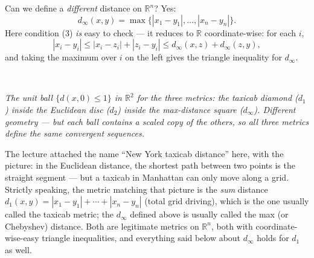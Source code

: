 \documentclass[11pt]{report}
\newcommand{\figcap}[1]{\\[1.5mm]\parbox{0.92\textwidth}{\small\itshape #1}}
\begin{document}
\begin{exbox}
Can we define a \emph{different} distance on $\mathbb{R}^n$? Yes:
\[
d_\infty(x,y) = \max\{|x_1 - y_1|, \ldots, |x_n - y_n|\}.
\]
Here condition (3) \emph{is} easy to check --- it reduces to $\mathbb{R}$ coordinate-wise: for each $i$,
\[
|x_i - y_i| \leq |x_i - z_i| + |z_i - y_i| \leq d_\infty(x,z) + d_\infty(z,y),
\]
and taking the maximum over $i$ on the left gives the triangle inequality for $d_\infty$.

\begin{center}
\figcap{The unit ball $\{ d(x, 0) \leq 1 \}$ in $\mathbb{R}^2$ for the three metrics: the taxicab diamond ($d_1$) inside the Euclidean disc ($d_2$) inside the max-distance square ($d_\infty$). Different geometry --- but each ball contains a scaled copy of the others, so all three metrics define the same convergent sequences.}
\end{center}

\end{exbox}

\begin{rembox}
The lecture attached the name ``New York taxicab distance'' here, with the picture: in the Euclidean distance, the shortest path between two points is the straight segment --- but a taxicab in Manhattan can only move along a grid. Strictly speaking, the metric matching that picture is the \emph{sum} distance $d_1(x,y) = |x_1 - y_1| + \cdots + |x_n - y_n|$ (total grid driving), which is the one usually called the taxicab metric; the $d_\infty$ defined above is usually called the max (or Chebyshev) distance. Both are legitimate metrics on $\mathbb{R}^n$, both with coordinate-wise-easy triangle inequalities, and everything said below about $d_\infty$ holds for $d_1$ as well.
\end{rembox}
\end{document}
